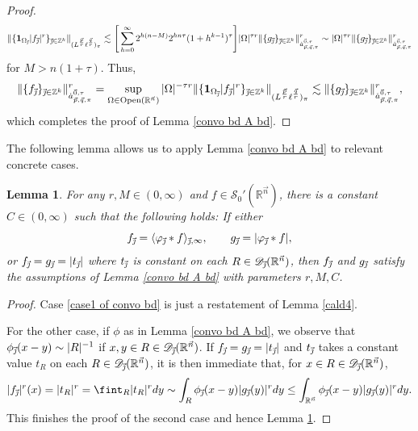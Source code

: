 \documentclass[11pt, reqno]{amsart}
\newtheorem{lemma}[theorem]{Lemma}
\theoremstyle{definition}
\theoremstyle{remark}
\numberwithin{equation}{section}
\newcommand{\D}{\mathscr D}
\newcommand{\R}{\mathbb R}
\newcommand{\Z}{\mathbb Z}
\newcommand{\vnull}{\vec 0}
\newcommand{\vj}{\vec{\textit{\j}}}
\newcommand{\vn}{\vec n}
\newcommand{\vp}{\vec p}
\newcommand{\vq}{\vec q}
\newcommand{\antau}{\dot a^{\vnull,\tau}_{\vp,\vq,\pi}}
\newcommand{\one}{\mathbf{1}}
\newcommand{\Ave}[3]{\langle#1\rangle_{#2,#3}}
\newcommand{\abs}[1]{|#1|}
\newcommand{\Norm}[2]{\|#1\|_{#2}}
\newcommand{\Open}{\mathrm{Open}}
\begin{document}
\begin{proof}
\begin{align*}
\Norm{\{\one_{\Omega_{\vj}}\abs{f_{\vj}}^r \}_{\vj\in\Z^k}}{(L^{\frac{\vp}r}\ell^{\frac{\vq}r})_\pi}
\lesssim \Bigg[ \sum_{h=0}^\infty 2^{h(n-M)} 2^{hn\tau}(1+h^{k-1})^{\tau}\Bigg]
\abs{\Omega}^{\tau r}\Norm{\{g_{\vj}\}_{\vj\in\Z^k}}{\antau}^r
\sim \abs{\Omega}^{\tau r}\Norm{\{g_{\vj}\}_{\vj\in\Z^k}}{\antau}^r
\end{align*}
for $M>n(1+\tau)$. Thus,
\begin{equation*}
\Norm{\{f_{\vj}\}_{\vj\in\Z^k}}{\antau}^r
= \sup_{\Omega\in\Open(\R^{\vn})}\abs{\Omega}^{-\tau r}\Norm{\{\one_{\Omega_{\vj}}\abs{f_{\vj}}^r \}_{\vj\in\Z^k}}{(L^{\frac{\vp}r}\ell^{\frac{\vq}r})_\pi}
\lesssim \Norm{\{g_{\vj}\}_{\vj\in\Z^k}}{\antau}^r,
\end{equation*}
which completes the proof of Lemma \ref{convo bd A bd}.
\end{proof}

The following lemma allows us to apply Lemma \ref{convo bd A bd} to relevant concrete cases.

\begin{lemma}\label{cases of convo bd}
For any $r,M\in(0,\infty)$ and $f\in\mathscr S_0'(\R^{\vn})$, there is a constant $C\in(0,\infty)$ such that the following holds: If either
\begin{equation}\label{case1 of convo bd}
f_{\vj}=\Ave{\varphi_{\vj}*f}{\vj}{\infty},\qquad g_{\vj}=\abs{\varphi_{\vj}*f},
\end{equation}
or $f_{\vj}=g_{\vj}=\abs{t_{\vj}}$ where $t_{\vj}$ is constant on each $R\in\D_{\vj}(\R^{\vn})$, then $f_{\vj}$ and $g_{\vj}$ satisfy the assumptions of Lemma \ref{convo bd A bd} with parameters $r,M,C$.
\end{lemma}

\begin{proof}
Case \eqref{case1 of convo bd} is just a restatement of Lemma \ref{cald4}.

For the other case, if $\phi$ as in Lemma \ref{convo bd A bd}, we observe that $\phi_{\vj}(x-y)\sim\abs{R}^{-1}$ if $x,y\in R\in\D_{\vj}(\R^{\vn})$.
If $f_{\vj}=g_{\vj}=\abs{t_{\vj}}$ and $t_{\vj}$ takes a constant value $t_R$ on each $R\in\D_{\vj}(\R^{\vn})$, it is then immediate that, for $x\in R\in\D_{\vj}(\R^{\vn})$,
\begin{align*}
\abs{f_{\vj}}^r(x)=\abs{t_R}^r
=\fint_R\abs{t_R}^r dy
\sim\int_R\phi_{\vj}(x-y)\abs{g_{\vj}(y)}^r dy
\leq\int_{\R^{\vn}}\phi_{\vj}(x-y)\abs{g_{\vj}(y)}^r dy.
\end{align*}
This finishes the proof of the second case
and hence Lemma \ref{cases of convo bd}.
\end{proof}
\end{document}
